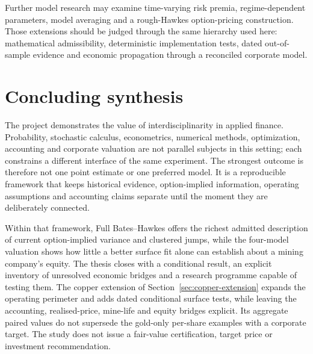 Further model research may examine time-varying risk premia, regime-dependent
parameters, model averaging and a rough-Hawkes option-pricing construction.
Those extensions should be judged through the same hierarchy used here:
mathematical admissibility, deterministic implementation tests, dated
out-of-sample evidence and economic propagation through a reconciled corporate
model.

\section*{Concluding synthesis}

The project demonstrates the value of interdisciplinarity in applied finance.
Probability, stochastic calculus, econometrics, numerical methods,
optimization, accounting and corporate valuation are not parallel subjects in
this setting; each constrains a different interface of the same experiment.
The strongest outcome is therefore not one point estimate or one preferred
model. It is a reproducible framework that keeps historical evidence,
option-implied information, operating assumptions and accounting claims
separate until the moment they are deliberately connected.

Within that framework, Full Bates--Hawkes offers the richest admitted
description of current option-implied variance and clustered jumps, while the
four-model valuation shows how little a better surface fit alone can establish
about a mining company's equity. The thesis closes with a conditional result,
an explicit inventory of unresolved economic bridges and a research programme
capable of testing them. The copper extension of
Section~\ref{sec:copper-extension} expands the operating perimeter and adds
dated conditional surface tests, while leaving the accounting, realised-price,
mine-life and equity bridges explicit. Its aggregate paired values do not
supersede the gold-only per-share examples with a corporate target.
The study does not issue a fair-value certification, target
price or investment recommendation.
